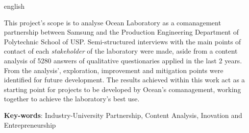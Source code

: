 \setlength{\absparsep}{18pt} %
\begin{resumo}[Abstract]
 \begin{otherlanguage*}{english}

This project's scope is to analyse Ocean Laboratory as a comanagement partnership between Samsung and the Production Engineering Department of Polytechnic School of USP. Semi-structured interviews with the main points of contact of each \textit{stakeholder} of the laboratory were made, aside from a content analysis of 5280 answers of qualitative questionaries applied in the last 2 years. From the analysis', exploration, improvement and mitigation points were identified for future development. The results achieved within this work act as a starting point for projects to be developed by Ocean's comanagement, working together to achieve the laboratory's best use.

   \vspace{\onelineskip}

   \noindent 
   \textbf{Key-words}: Industry-University Partnership, Content Analysis, Inovation and Entrepreneurship
 \end{otherlanguage*}
\end{resumo}
